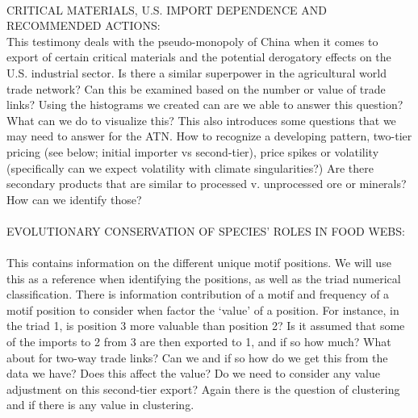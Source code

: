 \\
CRITICAL MATERIALS, U.S. IMPORT DEPENDENCE AND RECOMMENDED ACTIONS: ~\cite{silberglitt2015critical}\\
This testimony deals with the pseudo-monopoly of China when it comes to export of certain critical materials and the potential derogatory effects on the U.S. industrial sector. Is there a similar superpower in the agricultural world trade network? Can this be examined based on the number or value of trade links? Using the histograms we created can are we able to answer this question? What can we do to visualize this?
This also introduces some questions that we may need to answer for the ATN. How to recognize a developing pattern, two-tier pricing (see below; initial importer vs second-tier), price spikes or volatility (specifically can we expect volatility with climate singularities?) Are there secondary products that are similar to processed v. unprocessed ore or minerals? How can we identify those?\\
\\
EVOLUTIONARY CONSERVATION OF SPECIES' ROLES IN FOOD WEBS: ~\cite{stouffer2012evolutionary}\\
This contains information on the different unique motif positions. We will use this as a reference when identifying the positions, as well as the triad numerical classification. There is information contribution of a motif and frequency of a motif position to consider when factor the ‘value’ of a position. For instance, in the triad 1, is position 3 more valuable than position 2? Is it assumed that some of the imports to 2 from 3 are then exported to 1, and if so how much? What about for two-way trade links? Can we and if so how do we get this from the data we have? Does this affect the value? Do we need to consider any value adjustment on this second-tier export? Again there is the question of clustering and if there is any value in clustering.\\
\\